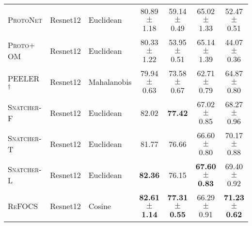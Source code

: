\begin{table*}[t]
{\begin{tabular}{@{}lllcccc@{}}
\textsc{ProtoNet \cite{proto_net}}     
& Resnet12 & Euclidean           
& 80.89 $\pm$ 1.18
& 59.14 $\pm$ 0.49 
& 65.02 $\pm$ 1.33   
& 52.47 $\pm$ 0.51  \\

\textsc{Proto$+$OM \cite{open_max}}  
& Resnet12 &Euclidean          
&  80.33 $\pm$ 1.22 
&  53.95 $\pm$ 0.51    
& 65.14 $\pm$ 1.39 
& 44.07 $\pm$ 0.36 \\

\textsc{PEELER}\textsuperscript{$\dagger$} \cite{peeler} 
& Resnet12 &Mahalanobis    
& 79.94 $\pm$ 0.63
& 73.58 $\pm$ 0.67
& 62.71 $\pm$ 0.79   
& 64.87 $\pm$ 0.80  \\

\textsc{Snatcher-F} \cite{snatcher} 
& Resnet12 &Euclidean    
& 82.02 
& \textbf{77.42} 
& 67.02 $\pm$ 0.85
& 68.27 $\pm$ 0.96  \\

\textsc{Snatcher-T} \cite{snatcher}  
& Resnet12 &Euclidean    
& 81.77
& 76.66
& 66.60$\pm$ 0.80 
& 70.17 $\pm$ 0.88  \\

\textsc{Snatcher-L} \cite{snatcher}  
& Resnet12 &Euclidean    
& \textbf{82.36}
& 76.15  
& \textbf{67.60 $\pm$ 0.83}  
& 69.40 $\pm$ 0.92  \\



\textsc{ReFOCS} 
& Resnet12 &Cosine         
& \textbf{82.61 $\pm$ 1.14}
& \textbf{77.31 $\pm$ 0.55} 
& 66.29 $\pm$ 0.91   
& \textbf{71.23 $\pm$ 0.62} \\
\bottomrule
\end{tabular}
}

\label{tab:miniimagenet}
\end{table*}